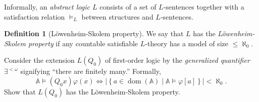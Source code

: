 \documentclass[10pt,letterpaper,cm]{nupset}
\theoremstyle{definition}
\newtheorem{definition}{Definition}
\theoremstyle{theorem}
\theoremstyle{remark}
\newcommand{\A}{\mathbb A}
\newcommand{\1}{\mathbb{1}}
\newcommand{\0}{\vec 0}
\DeclareMathOperator{\dom}{dom}
\begin{document}
Informally, an \textit{abstract logic $L$} consists of a set of $L$-sentences together with a satisfaction relation $\models_L$ between structures and $L$-sentences.

\begin{definition}[L\"owenheim-Skolem property]
We say that $L$ has the \textit{L\"owenheim-Skolem property} if any countable satisfiable $L$-theory  has a model of size $\leq \aleph_0$.
\end{definition}

\begin{problem}[7.]
Consider the extension $L(Q_0)$ of first-order logic by the \textit{generalized quantifier} $\exists^{<\omega}$ signifying ``there are finitely many.'' Formally, $$\A \models \left(Q_0{x}\right)\varphi(x) \iff \left\lvert{\left\{a \in \dom(\A) \mid \A \models \varphi[a]\right\}}\right\rvert < \aleph_0.$$ Show that $L(Q_0)$ has the L\"owenheim-Skolem property.
\end{problem}
\end{document}
